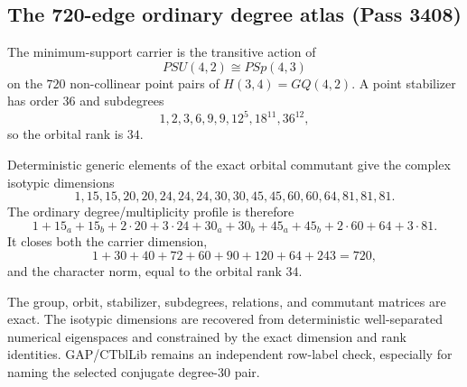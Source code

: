 \subsection{The 720-edge ordinary degree atlas (Pass 3408)}

The minimum-support carrier is the transitive action of
\[
PSU(4,2)\cong PSp(4,3)
\]
on the $720$ non-collinear point pairs of $H(3,4)=GQ(4,2)$.  A point stabilizer has order $36$ and subdegrees
\[
1,2,3,6,9,9,12^5,18^{11},36^{12},
\]
so the orbital rank is $34$.

Deterministic generic elements of the exact orbital commutant give the complex isotypic dimensions
\[
1,15,15,20,20,24,24,24,30,30,45,45,60,60,64,81,81,81.
\]
The ordinary degree/multiplicity profile is therefore
\[
\boxed{
1+15_a+15_b+2\cdot20+3\cdot24+30_a+30_b
+45_a+45_b+2\cdot60+64+3\cdot81.
}
\]
It closes both the carrier dimension,
\[
1+30+40+72+60+90+120+64+243=720,
\]
and the character norm, equal to the orbital rank $34$.

The group, orbit, stabilizer, subdegrees, relations, and commutant matrices are exact.  The isotypic dimensions are recovered from deterministic well-separated numerical eigenspaces and constrained by the exact dimension and rank identities.  GAP/CTblLib remains an independent row-label check, especially for naming the selected conjugate degree-$30$ pair.
